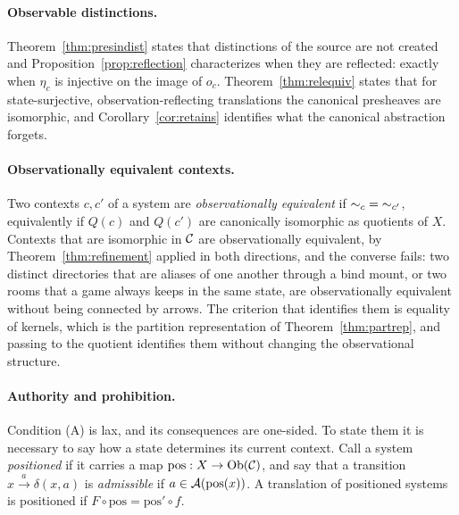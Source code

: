 \paragraph{Observable distinctions.} Theorem~\ref{thm:presindist} states that distinctions of the source are not created and Proposition~\ref{prop:reflection} characterizes when they are reflected: exactly when $\eta_c$ is injective on the image of $o_c$. Theorem~\ref{thm:relequiv} states that for state-surjective, observation-reflecting translations the canonical presheaves are isomorphic, and Corollary~\ref{cor:retains} identifies what the canonical abstraction forgets.

\paragraph{Observationally equivalent contexts.} Two contexts $c,c'$ of a system are \emph{observationally equivalent} if ${\sim_c}={\sim_{c'}}$, equivalently if $Q(c)$ and $Q(c')$ are canonically isomorphic as quotients of $X$. Contexts that are isomorphic in $\mathcal C$ are observationally equivalent, by Theorem~\ref{thm:refinement} applied in both directions, and the converse fails: two distinct directories that are aliases of one another through a bind mount, or two rooms that a game always keeps in the same state, are observationally equivalent without being connected by arrows. The criterion that identifies them is equality of kernels, which is the partition representation of Theorem~\ref{thm:partrep}, and passing to the quotient identifies them without changing the observational structure.

\paragraph{Authority and prohibition.} Condition (A) is lax, and its consequences are one-sided. To state them it is necessary to say how a state determines its current context. Call a system \emph{positioned} if it carries a map $\mathrm{pos}:X\to\mathrm{Ob}(\mathcal C)$, and say that a transition $x\xrightarrow{a}\delta(x,a)$ is \emph{admissible} if $a\in\mathcal A(\mathrm{pos}(x))$. A translation of positioned systems is positioned if $F\circ\mathrm{pos}=\mathrm{pos}'\circ f$.

